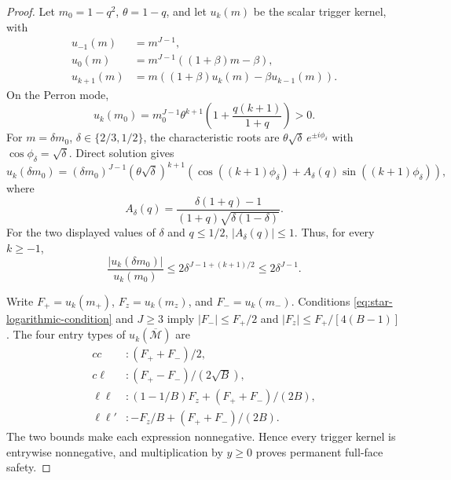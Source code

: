 \documentclass[11pt]{article}
\begin{document}
\begin{proof}
Let $m_0=1-q^2$, $\theta=1-q$, and let $u_k(m)$ be the scalar trigger
kernel, with
\begin{align*}
 u_{-1}(m)&=m^{J-1},\\
 u_0(m)&=m^{J-1}((1+\beta)m-\beta),\\
 u_{k+1}(m)&=m((1+\beta)u_k(m)-\beta u_{k-1}(m)).
\end{align*}
On the Perron mode,
\begin{equation}
 u_k(m_0)=m_0^{J-1}\theta^{k+1}
 \left(1+\frac{q(k+1)}{1+q}\right)>0.
 \label{eq:star-perron-trigger}
\end{equation}
For $m=\delta m_0$, $\delta\in\{2/3,1/2\}$, the characteristic roots are
$\theta\sqrt\delta\,e^{\pm i\phi_\delta}$ with
$\cos\phi_\delta=\sqrt\delta$.  Direct solution gives
\begin{equation}
 u_k(\delta m_0)=(\delta m_0)^{J-1}
 (\theta\sqrt\delta)^{k+1}
 \left(\cos((k+1)\phi_\delta)
 +A_\delta(q)\sin((k+1)\phi_\delta)\right),
 \label{eq:star-oscillatory-trigger}
\end{equation}
where
\[
 A_\delta(q)=
 \frac{\delta(1+q)-1}{(1+q)\sqrt{\delta(1-\delta)}}.
\]
For the two displayed values of $\delta$ and $q\leq1/2$,
$|A_\delta(q)|\leq1$.  Thus, for every $k\geq-1$,
\begin{equation}
 \frac{|u_k(\delta m_0)|}{u_k(m_0)}
 \leq2\delta^{J-1+(k+1)/2}
 \leq2\delta^{J-1}.
 \label{eq:star-mode-domination}
\end{equation}

Write $F_+=u_k(m_+)$, $F_z=u_k(m_z)$, and $F_-=u_k(m_-)$.  Conditions
\eqref{eq:star-logarithmic-condition} and $J\geq3$ imply
$|F_-|\leq F_+/2$ and
$|F_z|\leq F_+/[4(B-1)]$.  The four entry types of
$u_k(\overline{\mathcal M})$ are
\begin{align*}
 cc &: (F_++F_-)/2,\\
 c\ell &: (F_+-F_-)/(2\sqrt B),\\
 \ell\ell &: (1-1/B)F_z+(F_++F_-)/(2B),\\
 \ell\ell' &: -F_z/B+(F_++F_-)/(2B).
\end{align*}
The two bounds make each expression nonnegative.  Hence every trigger kernel
is entrywise nonnegative, and multiplication by $y\geq0$ proves permanent
full-face safety.
\end{proof}
\end{document}
